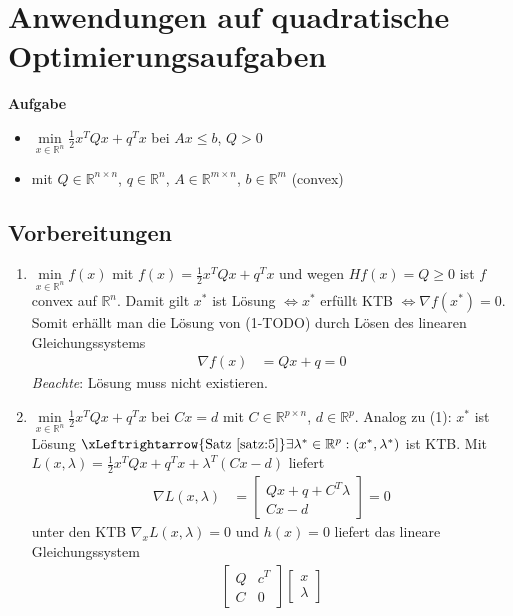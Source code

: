 \section{Anwendungen auf quadratische Optimierungsaufgaben}
\textbf{Aufgabe}
\begin{itemize}
	\item[] $\min\limits_{x\in\mathbb{R}^n} \frac12 x^TQx+q^Tx$ bei $Ax\le b$, $Q>0$
	\item[] mit $Q\in\mathbb{R}^{n\times n}$, $q\in\mathbb{R}^n$, $A\in\mathbb{R}^{m\times n}$, $b\in\mathbb{R}^m$ (convex) 
\end{itemize}
\subsection{Vorbereitungen}
\begin{enumerate}[label=(\arabic*)]
  \item $\min\limits_{x\in\mathbb{R}^n}f(x)$ mit $f(x)=\frac12 x^TQx+q^Tx$ und wegen $H f(x)=Q\ge 0$ ist $f$ convex auf $\mathbb{R}^n$. Damit gilt $x^{\ast}$ ist Lösung
  $\Leftrightarrow x^{\ast}$ erfüllt \ac{KTB} $\Leftrightarrow\nabla f(x^{\ast})=0$. Somit erhällt man die Lösung von (1-TODO) durch Lösen des linearen Gleichungssystems
  \begin{align*}
  	\nabla f(x) & = Qx+q =0
  \end{align*} 
  \textit{Beachte}: Lösung muss nicht existieren.
  \item $\min\limits_{x\in\mathbb{R}^n}\frac12 x^TQx+q^Tx$ bei $Cx=d$ mit $C\in\mathbb{R}^{p\times n}$, $d\in\mathbb{R}^p$. Analog zu (1): $x^{\ast}$ ist Lösung
  $\xLeftrightarrow{\text{Satz \ref{satz:5}}}\exists\lambda^{\ast}\in\mathbb{R}^p:(x^{\ast},\lambda^{\ast})$ ist \ac{KTB}. Mit $L(x,\lambda)=\frac12
  x^TQx+q^Tx+\lambda^T(Cx-d)$ liefert
  \begin{align*}
  \nabla L(x,\lambda) & = \begin{bmatrix}
  Qx+q+C^T\lambda \\
  Cx-d
  \end{bmatrix} = 0
  \end{align*} 
  unter den \ac{KTB} $\nabla_xL(x,\lambda)=0$ und $h(x)=0$ liefert das lineare Gleichungssystem
  \begin{align*}
  \begin{bmatrix}
  Q	& c^T\\ C	& 0 
  \end{bmatrix}\begin{bmatrix}
  x\\ \lambda

\end{bmatrix}
\end{align*}
\end{enumerate}
